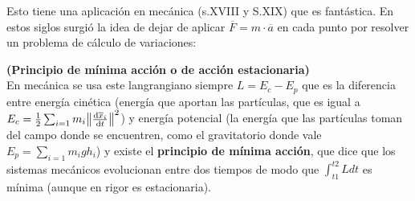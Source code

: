 \documentclass[palatino, bibnumbers]{apuntes}
\begin{document}
Esto tiene una aplicación en mecánica (s.XVIII y S.XIX) que es fantástica. En estos siglos surgió la idea de dejar de aplicar $\overline{F}=m\cdot\overline{a}$ en cada punto por resolver un problema de cálculo de variaciones: 
\newpage
\begin{prop}\textbf{(Principio de mínima acción o de acción estacionaria)}\\
	En mecánica se usa este langrangiano siempre $L=E_c-E_p$ que es la diferencia entre energía cinética (energía que aportan las partículas, que es igual a $E_c=\frac{1}{2}\sum_{i=1}m_i\norm{\dv{\overline{x}_i}{t}}^2$) y energía potencial (la energía que las partículas toman del campo donde se encuentren, como el gravitatorio donde vale $E_p=\sum_{i=1}m_igh_i$) y existe el \textbf{principio de mínima acción}, que dice que los sistemas mecánicos evolucionan entre dos tiempos de modo que $\int_{t1}^{t2}Ldt$ es mínima (aunque en rigor es estacionaria).
\end{prop}
\end{document}

